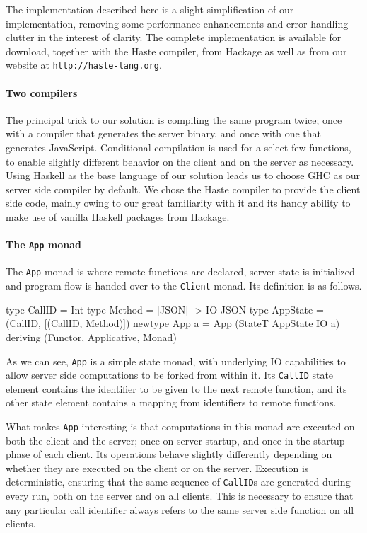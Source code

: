 \documentclass[preprint]{sigplanconf}
\begin{document}
The implementation described here is a slight simplification of our
implementation, removing some performance enhancements and error handling
clutter in the interest of clarity. The complete implementation is available
for download, together with the Haste compiler, from Hackage as well as from
our website at \lstinline!http://haste-lang.org!.


\paragraph{Two compilers}
The principal trick to our solution is compiling the same program twice; once
with a compiler that generates the server binary, and once with one that
generates JavaScript. Conditional compilation is used for a select few
functions, to enable slightly different behavior on the client and on the
server as necessary. Using Haskell as the base language of our solution leads
us to choose GHC as our server side compiler by default. We chose the Haste
compiler to provide the client side code, mainly owing to our great familiarity
with it and its handy ability to make use of vanilla Haskell packages from
Hackage.

\paragraph{The \lstinline!App! monad}
The \lstinline!App! monad is where remote functions are declared, server state
is initialized and program flow is handed over to the \lstinline!Client! monad.
Its definition is as follows.

\begin{code}
type CallID = Int
type Method = [JSON] -> IO JSON
type AppState = (CallID, [(CallID, Method)])
newtype App a = App (StateT AppState IO a)
  deriving (Functor, Applicative, Monad)
\end{code}

As we can see, \lstinline!App! is a simple state monad, with underlying IO
capabilities to allow server side computations to be forked from within it.
Its \lstinline!CallID! state element contains the identifier to be given to the
next remote function, and its other state element contains a mapping from
identifiers to remote functions.

What makes \lstinline!App! interesting is that computations in this monad are
executed on both the client and the server; once on server startup, and once
in the startup phase of each client. Its operations behave slightly differently
depending on whether they are executed on the client or on the server.
Execution is deterministic, ensuring that the same sequence of
\lstinline!CallID!s are generated during every run, both on the server and on
all clients. This is necessary to ensure that any particular call identifier
always refers to the same server side function on all clients.
\end{document}
